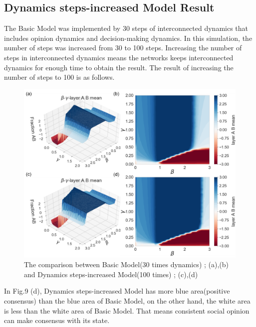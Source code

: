\documentclass[english]{cccconf}
\begin{document}
\subsection{Dynamics steps-increased Model Result}
The Basic Model was implemented by 30 steps of interconnected dynamics that includes opinion dynamics and decision-making dynamics. In this simulation, the number of steps was increased from 30 to 100 steps. Increasing the number of steps in interconnected dynamics means the networks keeps interconnected dynamics for enough time to obtain the result. The result of increasing the number of steps to 100 is as follows.
\begin{figure}[!htb]
  \centering
  \includegraphics[width=\hsize]{FIG9.png}
  \caption{The comparison between Basic Model(30 times dynamics) ; (a),(b) and Dynamics steps-increased Model(100 times) ; (c),(d)}
  \label{Fig9}
\end{figure}
In Fig.9 (d), Dynamics steps-increased Model has more blue area(positive consensus) than the blue area of Basic Model, on the other hand, the white area is less than the white area of Basic Model. That means consistent social opinion can make consensus with its state.
\end{document}
